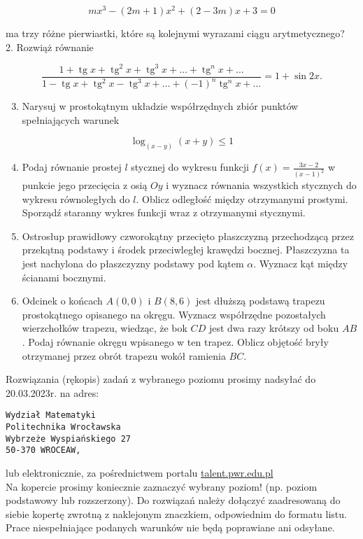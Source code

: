 \documentclass[10pt]{article}
\begin{document}
$$
m x^{3}-(2 m+1) x^{2}+(2-3 m) x+3=0
$$

ma trzy różne pierwiastki, które są kolejnymi wyrazami ciągu arytmetycznego?\\
2. Rozwiąż równanie

$$
\frac{1+\operatorname{tg} x+\operatorname{tg}^{2} x+\operatorname{tg}^{3} x+\ldots+\operatorname{tg}^{n} x+\ldots}{1-\operatorname{tg} x+\operatorname{tg}^{2} x-\operatorname{tg}^{3} x+\ldots+(-1)^{n} \operatorname{tg}^{n} x+\ldots}=1+\sin 2 x .
$$

\begin{enumerate}
  \setcounter{enumi}{2}
  \item Narysuj w prostokątnym układzie współrzędnych zbiór punktów spełniających warunek
\end{enumerate}

$$
\log _{(x-y)}(x+y) \leqslant 1
$$

\begin{enumerate}
  \setcounter{enumi}{3}
  \item Podaj równanie prostej $l$ stycznej do wykresu funkcji $f(x)=\frac{3 x-2}{(x-1)^{2}}$ w punkcie jego przecięcia z osią $O y$ i wyznacz równania wszystkich stycznych do wykresu równoległych do $l$. Oblicz odległość między otrzymanymi prostymi. Sporządź staranny wykres funkcji wraz z otrzymanymi stycznymi.
  \item Ostrosłup prawidłowy czworokątny przecięto płaszczyzną przechodzącą przez przekątną podstawy i środek przeciwległej krawędzi bocznej. Płaszczyzna ta jest nachylona do płaszczyzny podstawy pod kątem $\alpha$. Wyznacz kąt między ścianami bocznymi.
  \item Odcinek o końcach $A(0,0)$ i $B(8,6)$ jest dłuższą podstawą trapezu prostokątnego opisanego na okręgu. Wyznacz współrzędne pozostałych wierzchołków trapezu, wiedząc, że bok $C D$ jest dwa razy krótszy od boku $A B$. Podaj równanie okręgu wpisanego w ten trapez. Oblicz objętość bryły otrzymanej przez obrót trapezu wokół ramienia $B C$.
\end{enumerate}

Rozwiązania (rękopis) zadań z wybranego poziomu prosimy nadsyłać do 20.03.2023r. na adres:

\begin{verbatim}
Wydział Matematyki
Politechnika Wrocławska
Wybrzeże Wyspiańskiego 27
50-370 WROCEAW,
\end{verbatim}

lub elektronicznie, za pośrednictwem portalu \href{http://talent.pwr.edu.pl}{talent.pwr.edu.pl}\\
Na kopercie prosimy koniecznie zaznaczyć wybrany poziom! (np. poziom podstawowy lub rozszerzony). Do rozwiązań należy dołączyć zaadresowaną do siebie kopertę zwrotną z naklejonym znaczkiem, odpowiednim do formatu listu. Prace niespełniające podanych warunków nie będą poprawiane ani odsyłane.
\end{document}
